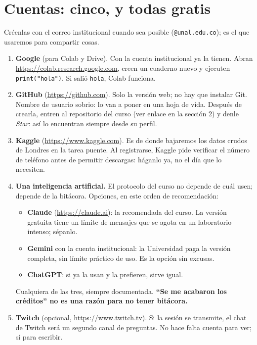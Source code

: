 \documentclass[12pt,letterpaper]{article}
\begin{document}
\section{Cuentas: cinco, y todas gratis}
Créenlas con el correo institucional cuando sea posible (\texttt{@unal.edu.co}); es el que usaremos para compartir cosas.

\begin{enumerate}[leftmargin=1.5em]
    \item \textbf{Google} (para Colab y Drive). Con la cuenta institucional ya la tienen. Abran \url{https://colab.research.google.com}, creen un cuaderno nuevo y ejecuten \texttt{print("hola")}. Si salió \texttt{hola}, Colab funciona.
    \item \textbf{GitHub} (\url{https://github.com}). Solo la versión web; no hay que instalar Git. Nombre de usuario sobrio: lo van a poner en una hoja de vida. Después de crearla, entren al repositorio del curso (ver enlace en la sección 2) y denle \emph{Star}: así lo encuentran siempre desde su perfil.
    \item \textbf{Kaggle} (\url{https://www.kaggle.com}). Es de donde bajaremos los datos crudos de Londres en la tarea puente. Al registrarse, Kaggle pide verificar el número de teléfono antes de permitir descargas: háganlo ya, no el día que lo necesiten.
    \item \textbf{Una inteligencia artificial.} El protocolo del curso no depende de cuál usen; depende de la bitácora. Opciones, en este orden de recomendación:
    \begin{itemize}[leftmargin=1.5em]
        \item \textbf{Claude} (\url{https://claude.ai}): la recomendada del curso. La versión gratuita tiene un límite de mensajes que se agota en un laboratorio intenso; sépanlo.
        \item \textbf{Gemini} con la cuenta institucional: la Universidad paga la versión completa, sin límite práctico de uso. Es la opción sin excusas.
        \item \textbf{ChatGPT}: si ya la usan y la prefieren, sirve igual.
    \end{itemize}
    Cualquiera de las tres, siempre documentada. \textbf{``Se me acabaron los créditos'' no es una razón para no tener bitácora.}
    \item \textbf{Twitch} (opcional, \url{https://www.twitch.tv}). Si la sesión se transmite, el chat de Twitch será un segundo canal de preguntas. No hace falta cuenta para ver; sí para escribir.
\end{enumerate}
\end{document}
